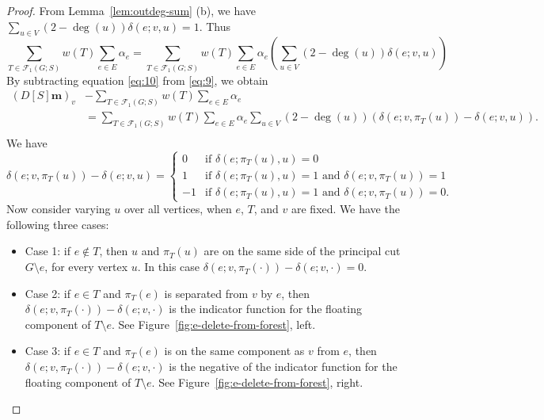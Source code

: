\documentclass[12pt]{amsart}
\theoremstyle{definition}
\newcommand{\boldm}{\mathbf{m}}
\newcommand{\trees}{\mathcal{F}_1}
\begin{document}
\begin{proof}
From Lemma~\ref{lem:outdeg-sum} (b), 
we have
$\displaystyle
	\sum_{u \in V} (2 - \deg(u)) \delta(e; v,u)
	= 1. 
$
Thus
\begin{equation}
\label{eq:10}
	\sum_{T \in \trees(G;S)} w({T}) \sum_{e \in E} \alpha_e
	= \sum_{T \in \trees(G;S)} w({T}) \sum_{e \in E} \alpha_e \left( \sum_{u \in V} (2 - \deg(u)) \delta(e; v,u) \right) 
\end{equation}
By subtracting equation \eqref{eq:10} from \eqref{eq:9}, we obtain
\[
\begin{split}
	(D[S] \boldm)_v &- \sum_{T \in \trees(G;S)} w({T}) \sum_{e \in E} \alpha_e \\
	&= \sum_{T \in \trees(G;S)} w({T}) \sum_{e \in E} \alpha_e \sum_{u \in V} (2 - \deg(u)) \left(\delta(e; v, \pi_T(u)) - \delta(e; v, u) \right).\\
\end{split}
\]
We have
\begin{equation}
\label{eq:delta-diff}
	\delta(e; v, \pi_T(u)) - \delta(e; v, u) = \begin{cases}
	0 &\text{if } \delta(e; \pi_T(u), u) = 0 \\
	1 &\text{if } \delta(e; \pi_T(u), u) = 1 \text{ and } \delta(e; v, \pi_T(u)) = 1 \\
	-1 &\text{if } \delta(e; \pi_T(u), u) = 1 \text{ and } \delta(e; v, \pi_T(u)) = 0 .
	\end{cases}
\end{equation}
Now consider varying $u$ over all vertices, when $e$, $T$, and $v$ are fixed.
We have the following three cases:

\begin{itemize}[leftmargin=*]
\item Case 1: if $e \not \in T$, then $u$ and $\pi_T(u)$ are on the same side of the principal cut $G \setminus e$, for every vertex $u$.
In this case $\delta(e;v, \pi_T(\cdot)) - \delta(e; v, \cdot) = 0$.

\item Case 2: if $e \in T$ and $\pi_T(e)$ is separated from $v$ by $e$, then $\delta(e;v, \pi_T(\cdot)) - \delta(e; v, \cdot)$ is the indicator function for the floating component of $T \setminus e$. See Figure~\ref{fig:e-delete-from-forest}, left.

\item Case 3: if $e \in T$ and $\pi_T(e)$ is on the same component as $v$ from $e$, then $\delta(e;v, \pi_T(\cdot)) - \delta(e; v, \cdot)$ is the negative of the indicator function for the floating component of $T \setminus e$. See Figure~\ref{fig:e-delete-from-forest}, right.
\end{itemize}
\begin{figure}[h]
\begin{minipage}{0.45\textwidth}
\centering
\end{minipage}
\end{figure}
\end{proof}
\end{document}
